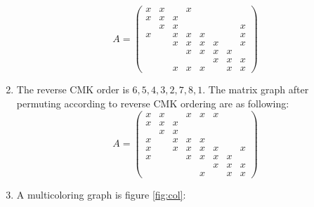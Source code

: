 \documentclass{ctexart}
\begin{document}
\begin{solution}
\begin{enumerate}
     \[
A =
\begin{pmatrix}
 x & x &   &  x &   &   &   &  \\
x &  x & x &   &   &  &  &   \\
  & x &  x   &  &   &  &   & x  \\
 x &   & x &  x & x &   &   &  x \\
  &   &  x & x &  x & x &   &   x\\
  &  &  & x & x &  x & x &   \\
  &  &   &   &   & x &  x &x \\
 &  &x   &   x&  x &   & x & x 
\end{pmatrix}
\]
\item The reverse CMK order is \(6,5,4,3,2,7,8,1 \). The matrix graph 
  after permuting according to reverse CMK ordering are as following: 
       \[
A =
\begin{pmatrix}
 x & x &   &  x &  x & x  &   &  \\
x &  x & x &   &   &  &  &   \\
  & x &  x   &  &   &  &   &   \\
 x &   & x &  x & x &   &   &   \\
 x &   &  x & x &  x & x &   &   x\\
 x &  &  & x & x &  x & x &   \\
  &  &   &   &   & x &  x &x \\
 &  &   &   &  x &   & x & x 
\end{pmatrix}
\]
\item A multicoloring graph is figure \ref{fig:col}: 
  \begin{figure}[!htbp]
    \centering
\end{figure}
\end{enumerate}
\end{solution}
\end{document}
